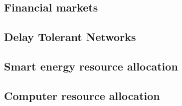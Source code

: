 \subsection{Financial markets}
\label{subsec:financial markets}

\subsection{Delay Tolerant Networks}
\label{subsec:dtn}

\subsection{Smart energy resource allocation}
\label{subsec:smart energy}

\subsection{Computer resource allocation}
\label{subsec:computer resource}